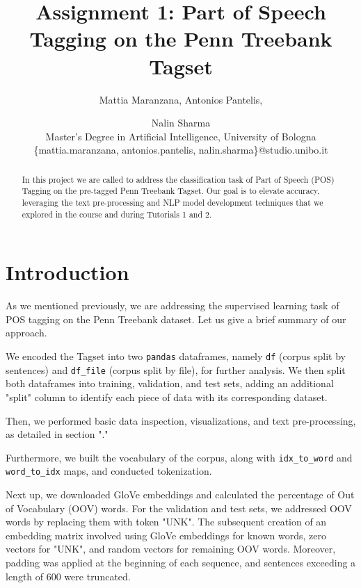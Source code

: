 \documentclass[11pt]{article}
\begin{document}
\title{Assignment 1: Part of Speech Tagging on the Penn Treebank Tagset}

\author{Mattia Maranzana,
Antonios Pantelis,
\and
Nalin Sharma\\
Master's Degree in Artificial Intelligence, University of Bologna\\
\{mattia.maranzana, antonios.pantelis, nalin.sharma\}@studio.unibo.it
}
\maketitle

\begin{abstract}
In this project we are called to address the classification task of Part of Speech (POS) Tagging on the pre-tagged Penn Treebank Tagset. Our goal is to elevate accuracy, leveraging the text pre-processing and NLP model development techniques that we explored in the course and during Tutorials 1 and 2.
\end{abstract}

\section{Introduction}

As we mentioned previously, we are addressing the supervised learning task of POS tagging on the Penn Treebank dataset. Let us give a brief summary of our approach.

We encoded the Tagset into two \texttt{pandas} dataframes, namely \texttt{df} (corpus split by sentences) and \texttt{df\_file} (corpus split by file), for further analysis. We then split both dataframes into training, validation, and test sets, adding an additional "split" column to identify each piece of data with its corresponding dataset.

Then, we performed basic data inspection, visualizations, and text pre-processing, as detailed in section "."

Furthermore, we built the vocabulary of the corpus, along with \texttt{idx\_to\_word} and \texttt{word\_to\_idx} maps, and conducted tokenization.

Next up, we downloaded GloVe embeddings and calculated the percentage of Out of Vocabulary (OOV) words. For the validation and test sets, we addressed OOV words by replacing them with token "UNK". The subsequent creation of an embedding matrix involved using GloVe embeddings for known words, zero vectors for "UNK", and random vectors for remaining OOV words. Moreover, padding was applied at the beginning of each sequence, and sentences exceeding a length of 600 were truncated.
\end{document}
